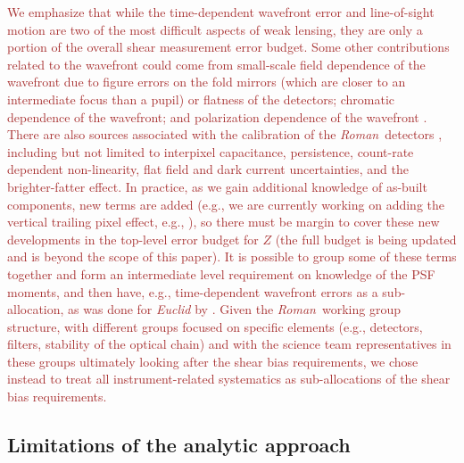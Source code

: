 \documentclass[usenatbib]{mnras}
\newcommand{\wfirst}{{\slshape Roman}}
\newcommand{\changetext}[1]{\textcolor{brown}{#1}}
\begin{document}
\changetext{We emphasize that while the time-dependent wavefront error and line-of-sight motion are two of the most difficult aspects of weak lensing, they are only a portion of the overall shear measurement error budget. Some other contributions related to the wavefront could come from small-scale field dependence of the wavefront due to figure errors on the fold mirrors (which are closer to an intermediate focus than a pupil) or flatness of the detectors; chromatic dependence of the wavefront; and polarization dependence of the wavefront \citep{2020MNRAS.tmp.1430L}. There are also sources associated with the calibration of the \wfirst\ detectors \citep{2020arXiv200500505M}, including but not limited to interpixel capacitance, persistence, count-rate dependent non-linearity, flat field and dark current uncertainties, and the brighter-fatter effect. In practice, as we gain additional knowledge of as-built components, new terms are added (e.g., we are currently working on adding the vertical trailing pixel effect, e.g., \citealt{2020arXiv200305978F}), so there must be margin to cover these new developments in the top-level error budget for $Z$ (the full budget is being updated and is beyond the scope of this paper). It is possible to group some of these terms together and form an intermediate level requirement on knowledge of the PSF moments, and then have, e.g., time-dependent wavefront errors as a sub-allocation, as was done for {\slshape Euclid} by \citet{2013MNRAS.431.3103C}. Given the \wfirst\ working group structure, with different groups focused on specific elements (e.g., detectors, filters, stability of the optical chain) and with the science team representatives in these groups ultimately looking after the shear bias requirements, we chose instead to treat all instrument-related systematics as sub-allocations of the shear bias requirements.}

\subsection{Limitations of the analytic approach}
\end{document}
